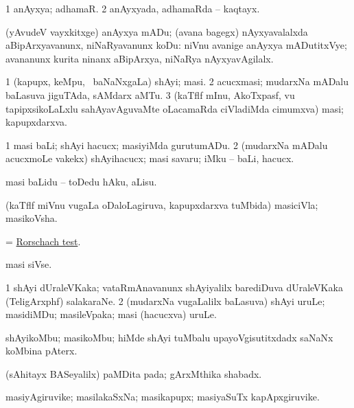 \bentry
{}
\gl{\nA}
\bmng
\bnum
\num{1} anAyxya; adhamaR. 
\num{2} anAyxyada, adhamaRda -- kaqtayx. 
\enum
\emng

\noindent 
\gl{\nuga}
\bmng
{} (yAvudeV vayxkitxge) anAyxya mADu; (avana bagegx) nAyxyavalalxda aBipArxyavanunx, niNaRyavanunx koDu:  niVnu avanige anAyxya mADutitxVye; avananunx kurita ninanx aBipArxya, niNaRya nAyxyavAgilalx. 
\emng
\eentry

\bentry
{}
\gl{\nA}
\bmng
\bnum
\num{1} (kapupx, keMpu, \mo\ baNaNxgaLa) shAyi; masi. 
\num{2} acucxmasi; mudarxNa mADalu baLasuva jiguTAda, sAMdarx aMTu. 
\num{3} (kaTflf mInu, AkoTxpasf, \mo vu tapipxsikoLaLxlu sahAyavAguvaMte oLacamaRda ciVladiMda cimumxva) masi; kapupxdarxva. 
\enum
\emng
\eentry

\bentry
{}
\gl{\sakirx}
\bmng
\bnum
\num{1} masi baLi; shAyi hacucx; masiyiMda gurutumADu. 
\num{2} (mudarxNa mADalu acucxmoLe \mo vakekx) shAyihacucx; masi savaru; iMku -- baLi, hacucx. 
\enum
\emng

\noindent 
\gl{\pagu}
\bmng
{} masi baLidu -- toDedu hAku, aLisu. 
\emng
\eentry

\bentry
{}
\gl{\nA}
\bmng
(kaTflf miVnu \mo vugaLa oDaloLagiruva, kapupxdarxva tuMbida) masiciVla; masikoVsha. 
\emng
\eentry

\bentry
{}
\gl{\nA}
\bmng
= \hyperref{kandict_r.pdf}{R}{Rorschach test}{Rorschach test}. 
\emng
\eentry

\bentry
{}
\gl{\nA}
\bmng
masi siVse. 
\emng
\eentry

\bentry
{}
\gl{\nA}
\bmng
\bnum
\num{1} shAyi dUraleVKaka; vataRmAnavanunx shAyiyalilx barediDuva dUraleVKaka (TeligArxphf) salakaraNe. 
\num{2} (mudarxNa \mo vugaLalilx baLasuva) shAyi uruLe; masidiMDu; masileVpaka; masi (hacucxva) uruLe. 
\enum
\emng
\eentry

\bentry
{}
\gl{\nA}
\bmng
shAyikoMbu; masikoMbu; hiMde shAyi tuMbalu upayoVgisutitxdadx saNaNx koMbina pAterx. 
\emng

\noindent 
\gl{\nuga}
\bmng
{} (sAhitayx BASeyalilx) paMDita pada; gArxMthika shabadx. 
\emng
\eentry

\bentry
{}
\gl{\nA}
\bmng
masiyAgiruvike; masilakaSxNa; masikapupx; masiyaSuTx kapApxgiruvike. 
\emng
\eentry

